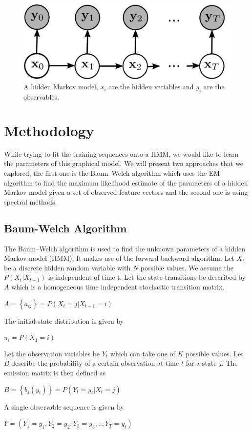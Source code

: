 \documentclass[letterpaper]{article}
\begin{document}
\begin{figure}[h]
	\includegraphics[scale=0.2]{"hmm"}
	\caption{A hidden Markov model, $x_{i}$ are the hidden variables and $y_{i}$ are the observables.}
\end{figure}

\section{Methodology}
While trying to fit the training sequences onto a HMM, we would like to learn the parameters of this graphical model. We will present two approaches that we explored, the first one is the Baum–Welch algorithm which uses the EM algorithm to find the maximum likelihood estimate of the parameters of a hidden Markov model given a set of observed feature vectors and the second one is using spectral methods.

\subsection{Baum-Welch Algorithm}

The Baum–Welch algorithm is used to find the unknown parameters of a hidden Markov model (HMM). It makes use of the forward-backward algorithm. Let $X_{t}$ be a discrete hidden random variable with $N$ possible values. We assume the $P(X_{t}|X_{t-1})$ is independent of time t. Let the state transitions be described by $A$ which is a homogeneous time independent stochastic transition matrix. 
\begin{center}
	$A = \left\lbrace a_{ij} \right\rbrace = P(X_{t}=j|X_{t-1}=i)$
\end{center}
The initial state distribution is given by
\begin{center}
	$\pi_{i} = P(X_{1}=i)$
\end{center}
Let the observation variables be $Y_{t}$ which can take one of $K$ possible values. Let $B$ describe the probability of a certain observation at time $t$ for a state $j$. The emission matrix is then defined as
\begin{center}
	$B = \left\lbrace b_{j}(y_{t}) \right\rbrace = P(Y_{t}=y_{t}|X_{t}=j)$
\end{center}
A single observable sequence is given by 
\begin{center}
	$Y = (Y_{1}=y_{1},Y_{2}=y_{2},Y_{3}=y_{3},..,Y_{T}=y_{t})$
\end{center}
\end{document}
